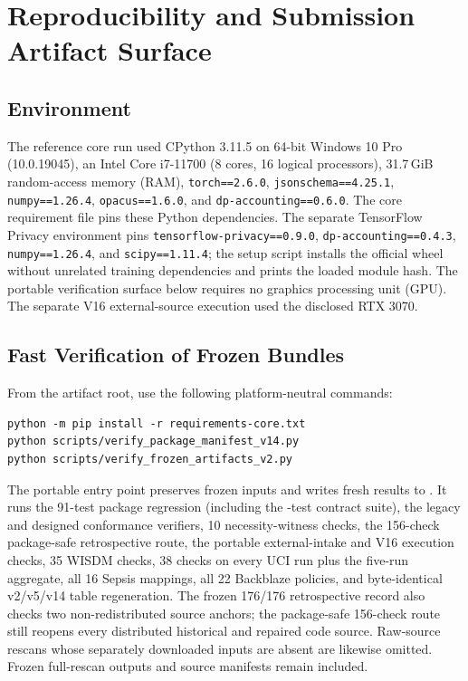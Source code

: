 \documentclass[letterpaper]{article} %
\begin{document}


\section{Reproducibility and Submission Artifact Surface}
\label{sec:supp-repro}

\subsection{Environment}

The reference core run used CPython 3.11.5 on 64-bit Windows 10 Pro
(10.0.19045), an Intel Core i7-11700 (8 cores, 16 logical processors),
31.7\,GiB random-access memory (RAM), \texttt{torch==2.6.0},
\texttt{jsonschema==4.25.1}, \texttt{numpy==1.26.4},
\texttt{opacus==1.6.0}, and \texttt{dp-accounting==0.6.0}.  The core
requirement file pins these Python dependencies.  The separate
TensorFlow Privacy environment pins \texttt{tensorflow-privacy==0.9.0},
\texttt{dp-accounting==0.4.3}, \texttt{numpy==1.26.4}, and
\texttt{scipy==1.11.4}; the setup script installs the official wheel without
 unrelated training dependencies and prints the loaded module hash.  The
 portable verification surface below requires no graphics processing unit
 (GPU).  The separate V16
 external-source execution used the disclosed RTX 3070.

\subsection{Fast Verification of Frozen Bundles}

From the artifact root, use the following platform-neutral commands:
\begingroup
\scriptsize
\begin{verbatim}
python -m pip install -r requirements-core.txt
python scripts/verify_package_manifest_v14.py
python scripts/verify_frozen_artifacts_v2.py
\end{verbatim}
\endgroup
The portable entry point preserves frozen inputs and writes fresh results to
.  It runs the 91-test package regression
(including the \AuditContractTestCount-test contract suite), the legacy and
designed conformance verifiers, 10 necessity-witness checks, the 156-check
package-safe retrospective route, the portable external-intake and V16
execution checks, 35 WISDM checks, 38 checks on every UCI run plus the
five-run aggregate, all 16 Sepsis mappings, all 22 Backblaze policies, and
byte-identical v2/v5/v14 table regeneration.  The frozen 176/176 retrospective record
also checks two non-redistributed source anchors; the package-safe 156-check
route still reopens every distributed historical and repaired code source.
Raw-source rescans whose separately downloaded inputs are absent
are likewise omitted.  Frozen full-rescan outputs and source manifests remain
included.
\end{document}
